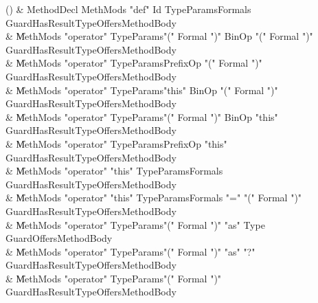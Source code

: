 \begin{bbgrammarappendix}

() & MethodDecl \label{prod:MethodDecl}  \: MethMods \xcd"def" Id TypeParams\opt Formals Guard\opt HasResultType\opt Offers\opt MethodBody  \\

 &    \| MethMods \xcd"operator" TypeParams\opt \xcd"(" Formal  \xcd")" BinOp \xcd"(" Formal  \xcd")" Guard\opt HasResultType\opt Offers\opt MethodBody \\
 &    \| MethMods \xcd"operator" TypeParams\opt PrefixOp \xcd"(" Formal  \xcd")" Guard\opt HasResultType\opt Offers\opt MethodBody \\
 &    \| MethMods \xcd"operator" TypeParams\opt \xcd"this" BinOp \xcd"(" Formal  \xcd")" Guard\opt HasResultType\opt Offers\opt MethodBody \\
 &    \| MethMods \xcd"operator" TypeParams\opt \xcd"(" Formal  \xcd")" BinOp \xcd"this" Guard\opt HasResultType\opt Offers\opt MethodBody \\
 &    \| MethMods \xcd"operator" TypeParams\opt PrefixOp \xcd"this" Guard\opt HasResultType\opt Offers\opt MethodBody \\
 &    \| MethMods \xcd"operator" \xcd"this" TypeParams\opt Formals Guard\opt HasResultType\opt Offers\opt MethodBody \\
 &    \| MethMods \xcd"operator" \xcd"this" TypeParams\opt Formals \xcd"=" \xcd"(" Formal  \xcd")" Guard\opt HasResultType\opt Offers\opt MethodBody \\
 &    \| MethMods \xcd"operator" TypeParams\opt \xcd"(" Formal  \xcd")" \xcd"as" Type Guard\opt Offers\opt MethodBody \\
 &    \| MethMods \xcd"operator" TypeParams\opt \xcd"(" Formal  \xcd")" \xcd"as" \xcd"?" Guard\opt HasResultType\opt Offers\opt MethodBody \\
 &    \| MethMods \xcd"operator" TypeParams\opt \xcd"(" Formal  \xcd")" Guard\opt HasResultType\opt Offers\opt MethodBody \\

\end{bbgrammarappendix}

